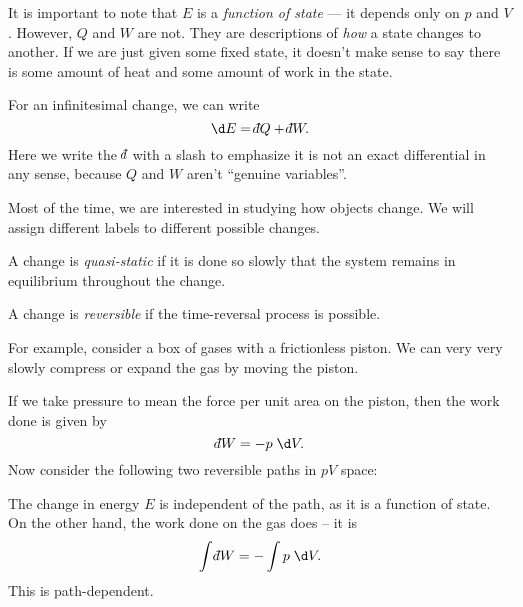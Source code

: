 \documentclass[a4paper]{article}
\def\di{{\mathchar'26\mkern-12mu d}}
\begin{document}
It is important to note that $E$ is a \emph{function of state} --- it depends only on $p$ and $V$. However, $Q$ and $W$ are not. They are descriptions of \emph{how} a state changes to another. If we are just given some fixed state, it doesn't make sense to say there is some amount of heat and some amount of work in the state.

For an infinitesimal change, we can write
\[
  \d E = \di Q + \di W.
\]
Here we write the $\di$ with a slash to emphasize it is not an exact differential in any sense, because $Q$ and $W$ aren't ``genuine variables''.

Most of the time, we are interested in studying how objects change. We will assign different labels to different possible changes.
\begin{defi}
  A change is \emph{quasi-static} if it is done so slowly that the system remains in equilibrium throughout the change.
\end{defi}

\begin{defi}
  A change is \emph{reversible} if the time-reversal process is possible.
\end{defi}
For example, consider a box of gases with a frictionless piston. We can very very slowly compress or expand the gas by moving the piston.
\begin{center}
\end{center}
If we take pressure to mean the force per unit area on the piston, then the work done is given by
\[
  \di W = - p \;\d V.
\]
Now consider the following two reversible paths in $pV$ space:
\begin{center}
\end{center}
The change in energy $E$ is independent of the path, as it is a function of state. On the other hand, the work done on the gas does -- it is
\[
  \int \di W = - \int p\; \d V.
\]
This is path-dependent.
\end{document}
